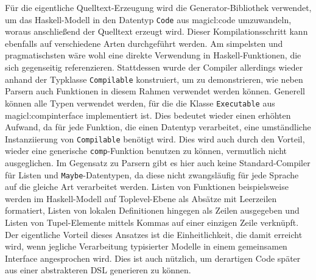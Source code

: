 \documentclass[12pt, a4paper, bibgerm]{scrbook}
\newcommand\icode[1]{\lstinline?#1?}
\newcommand\sref{}
\begin{document}
Für die eigentliche Quelltext-Erzeugung wird die Generator-Bibliothek
verwendet, um das Haskell-Modell in den Datentyp \icode{Code} aus
\sref{magicl:code} umzuwandeln, woraus anschließend der Quelltext
erzeugt wird. Dieser Kompilationsschritt kann ebenfalls auf verschiedene
Arten durchgeführt werden. Am simpelsten und pragmatischsten wäre wohl
eine direkte Verwendung in Haskell-Funktionen, die sich gegenseitig
referenzieren. Stattdessen wurde der Compiler allerdings wieder anhand
der Typklasse \icode{Compilable} konstruiert, um zu demonstrieren, wie
neben Parsern auch Funktionen in diesem Rahmen verwendet werden
können. Generell können alle Typen verwendet werden, für die die Klasse
\icode{Executable} aus \sref{magicl:compinterface} implementiert
ist. Dies bedeutet wieder einen erhöhten Aufwand, da für jede Funktion,
die einen Datentyp verarbeitet, eine umständliche Instanziierung von
\icode{Compilable} benötigt wird. Dies wird auch durch den Vorteil,
wieder eine generische \icode{comp}-Funktion benutzen zu können,
vermutlich nicht ausgeglichen. Im Gegensatz zu Parsern gibt es hier auch
keine Standard-Compiler für Listen und \icode{Maybe}-Datentypen, da
diese nicht zwangsläufig für jede Sprache auf die gleiche Art
verarbeitet werden. Listen von Funktionen beispielsweise werden im
Haskell-Modell auf Toplevel-Ebene als Absätze mit Leerzeilen formatiert,
Listen von lokalen Definitionen hingegen als Zeilen ausgegeben und
Listen von Tupel-Elemente mittels Kommas auf einer einzigen Zeile
verknüpft. Der eigentliche Vorteil dieses Ansatzes ist die
Einheitlichkeit, die damit erreicht wird, wenn jegliche Verarbeitung
typisierter Modelle in einem gemeinsamen Interface angesprochen
wird. Dies ist auch nützlich, um derartigen Code später aus einer
abstrakteren DSL generieren zu können.
\end{document}
